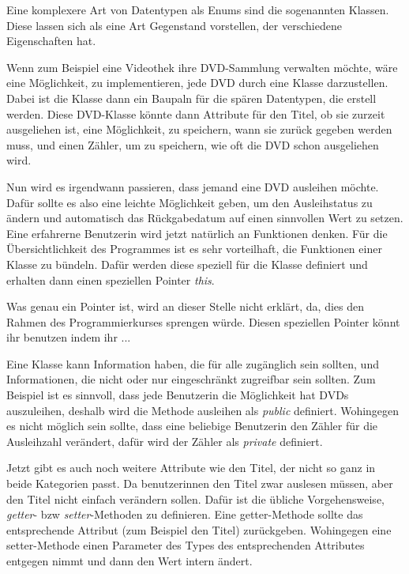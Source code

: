 
Eine komplexere Art von Datentypen als Enums sind die sogenannten Klassen. Diese lassen sich als eine Art Gegenstand vorstellen, der verschiedene Eigenschaften hat.

Wenn zum Beispiel eine Videothek ihre DVD-Sammlung verwalten möchte, wäre eine Möglichkeit, zu implementieren, jede DVD durch eine Klasse darzustellen. Dabei ist die Klasse dann ein Baupaln für die spären Datentypen, die erstell werden. Diese DVD-Klasse könnte dann Attribute für den Titel, ob sie zurzeit ausgeliehen ist, eine Möglichkeit, zu speichern, wann sie zurück gegeben werden muss, und einen Zähler, um zu speichern, wie oft die DVD schon ausgeliehen wird.

Nun wird es irgendwann passieren, dass jemand eine DVD ausleihen möchte. Dafür sollte es also eine leichte Möglichkeit geben, um den Ausleihstatus zu ändern und automatisch das Rückgabedatum auf einen sinnvollen Wert zu setzen.
Eine erfahrerne Benutzerin wird jetzt natürlich an Funktionen denken. Für die Übersichtlichkeit des Programmes ist es sehr vorteilhaft, die Funktionen einer Klasse zu bündeln. Dafür werden diese speziell für die Klasse definiert und erhalten dann einen speziellen Pointer \emph{this}. %

Was genau ein Pointer ist, wird an dieser Stelle nicht erklärt, da, dies den Rahmen des Programmierkurses sprengen würde. Diesen speziellen Pointer könnt ihr benutzen indem ihr ... %

Eine Klasse kann Information haben, die für alle zugänglich sein sollten, und Informationen, die nicht oder nur eingeschränkt zugreifbar sein sollten. Zum Beispiel ist es sinnvoll, dass jede Benutzerin die Möglichkeit hat DVDs auszuleihen, deshalb wird die Methode ausleihen als \emph{public} definiert. Wohingegen es nicht möglich sein sollte, dass eine beliebige Benutzerin den Zähler für die Ausleihzahl verändert, dafür wird der Zähler als \emph{private} definiert.

Jetzt gibt es auch noch weitere Attribute wie den Titel, der nicht so ganz in beide Kategorien passt. Da benutzerinnen den Titel zwar auslesen müssen, aber den Titel nicht einfach verändern sollen. Dafür ist die übliche Vorgehensweise, \emph{getter}- bzw \emph{setter}-Methoden zu definieren. Eine getter-Methode sollte das entsprechende Attribut (zum Beispiel den Titel) zurückgeben. Wohingegen eine setter-Methode einen Parameter des Types des entsprechenden Attributes entgegen nimmt und dann den Wert intern ändert.






